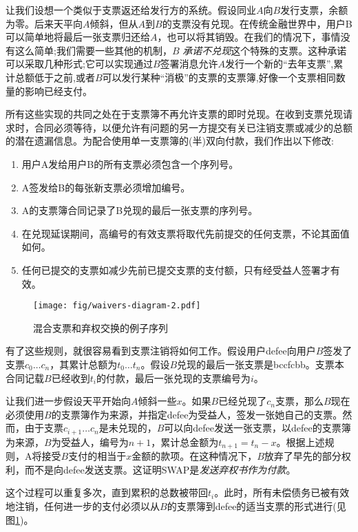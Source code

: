 让我们设想一个类似于支票返还给发行方的系统。假设同业$A$向$B$发行支票，余额为零。后来天平向$A$倾斜，但从$A$到$B$的支票没有兑现。在传统金融世界中，用户B可以简单地将最后一张支票归还给$A$，也可以将其销毁。在我们的情况下，事情没有这么简单;我们需要一些其他的机制，$B$ \emph{承诺不兑现}这个特殊的支票。这种承诺可以采取几种形式;它可以实现通过$B$签署消息允许$A$发行一个新的“去年支票”,累计总额低于之前,或者$B$可以发行某种“消极”的支票的支票簿,好像一个支票相同数量的影响已经支付。

所有这些实现的共同之处在于支票簿不再允许支票的即时兑现。在收到支票兑现请求时，合同必须等待，以便允许有问题的另一方提交有关已注销支票或减少的总额的潜在遗漏信息。为配合使用单一支票簿的(半)双向付款，我们作出以下修改:

\begin{enumerate}
    \item 用户A发给用户B的所有支票必须包含一个序列号。
    \item A签发给B的每张新支票必须增加编号。
    \item A的支票簿合同记录了B兑现的最后一张支票的序列号。
    \item 在兑现延误期间，高编号的有效支票将取代先前提交的任何支票，不论其面值如何。
    \item 任何已提交的支票如减少先前已提交支票的支付额，只有经受益人签署才有效。
\end{enumerate}


\begin{figure}[htbp]
\centering
\texttt{[image: fig/waivers-diagram-2.pdf]}
\caption[混合支票和弃权交换的示例序列\statusgreen]{混合支票和弃权交换的例子序列}
\label{fig:waivers-diagram}
\end{figure}

有了这些规则，就很容易看到支票注销将如何工作。假设用户defee向用户$B$签发了支票$c_0 \ldots c_n$，其累计总额为$t_0 \ldots t_n$。假设$B$兑现的最后一张支票是bccfcbb。支票本合同记载$B$已经收到$t_i$的付款，最后一张兑现的支票编号为$i$。

让我们进一步假设天平开始向$A$倾斜一些$x$。如果$B$已经兑现了$c_n$支票，那么$B$现在必须使用$B$的支票簿作为来源，并指定defee为受益人，签发一张她自己的支票。然而，由于支票$c_{i+1} \ldots c_n$是未兑现的，$B$可以向defee发送一张支票，以defee的支票簿为来源，$B$为受益人，编号为$n+1$，累计总金额为$t_{n+1} = t_n - x$。根据上述规则，A将接受$B$支付的相当于$x$金额的款项。在这种情况下，$B$放弃了早先的部分权利，而不是向defee发送支票。这证明SWAP是\emph{发送弃权书作为付款}。

这个过程可以重复多次，直到累积的总数被带回$t_i$。此时，所有未偿债务已被有效地注销，任何进一步的支付必须以从$B$的支票簿到defee的适当支票的形式进行(见图\ref{fig:waivers-diagram})。

